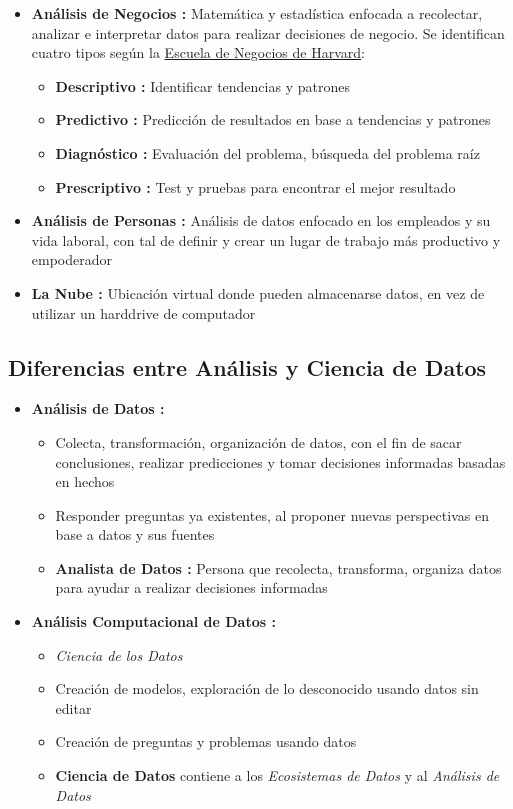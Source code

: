 \begin{itemize}
    \item {\textbf{Análisis de Negocios : }Matemática y estadística enfocada a recolectar, analizar e interpretar datos para realizar decisiones de negocio. Se identifican cuatro tipos según la \href{https://online.hbs.edu/blog/post/business-analytics-examples}{Escuela de Negocios de Harvard}:
    \begin{itemize}
        \item {\textbf{Descriptivo : }Identificar tendencias y patrones}
        \item {\textbf{Predictivo : }Predicción de resultados en base a tendencias y patrones}
        \item {\textbf{Diagnóstico : }Evaluación del problema, búsqueda del problema raíz}
        \item {\textbf{Prescriptivo : }Test y pruebas para encontrar el mejor resultado}
    \end{itemize}}
    
    \item {\textbf{Análisis de Personas : }Análisis de datos enfocado en los empleados y su vida laboral, con tal de definir y crear un lugar de trabajo más productivo y empoderador}
    
    \item {\textbf{La Nube : }Ubicación virtual donde pueden almacenarse datos, en vez de utilizar un harddrive de computador}
\end{itemize}

\subsection{Diferencias entre Análisis y Ciencia de Datos}
\begin{itemize}
    \item {\textbf{Análisis de Datos : }
    \begin{itemize}
        \item {Colecta, transformación, organización de datos, con el fin de sacar conclusiones, realizar predicciones y tomar decisiones informadas basadas en hechos}
        \item {Responder preguntas ya existentes, al proponer nuevas perspectivas en base a datos y sus fuentes}
        \item {\textbf{Analista de Datos : }Persona que recolecta, transforma, organiza datos para ayudar a realizar decisiones informadas}
    \end{itemize}}
    \item {\textbf{Análisis Computacional de Datos : }
    \begin{itemize}
        \item {\textit{Ciencia de los Datos }}
        \item {Creación de modelos, exploración de lo desconocido usando datos sin editar}
        \item {Creación de preguntas y problemas usando datos}
        \item {\textbf{Ciencia de Datos} contiene a los \textit{Ecosistemas de Datos} y al \textit{Análisis de Datos}}
    \end{itemize}}
\end{itemize}

\newpage